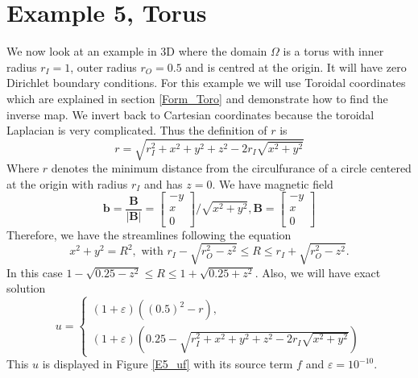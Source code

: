 \documentclass[12pt]{ociamthesis}
\begin{document}
\section{Example 5, Torus}
We now look at an example in 3D where the domain $\Omega $ is a torus with inner radius $r_I = 1$, outer radius $r_O = 0.5$ and is centred at the origin. It will have zero Dirichlet boundary conditions. For this example we will use Toroidal coordinates which are explained in section \ref{Form_Toro} and demonstrate how to find the inverse map. We invert back to Cartesian coordinates because the toroidal Laplacian is very complicated. Thus the definition of $r$ is
\begin{equation}
r = \sqrt{r_I^2 + x^2 + y^2 + z^2 -2r_I\sqrt{x^2+y^2}}
\end{equation}
Where $r$ denotes the minimum distance from the circulfurance of a circle centered at the origin with radius $r_I$ and has $z=0$. We have magnetic field 
\begin{equation}
\mathbf{b} = \frac{\mathbf{B}}{|\mathbf{B}|} = 
\left[ \begin{matrix}
-y\\
 x \\
 0
\end{matrix} \right]/\sqrt{x^2+y^2}, 
\mathbf{B} = \left[ \begin{matrix}
-y\\
 x\\
 0
\end{matrix} \right]
\end{equation}
Therefore, we have the streamlines following the equation
\begin{equation}
x^2 + y^2 = R^2, \text{ with } r_I-\sqrt{r_O^2-z^2} \leq R \leq r_I+\sqrt{r_O^2-z^2}.
\end{equation}
In this case $1-\sqrt{0.25-z^2} \leq R \leq 1 + \sqrt{0.25+z^2}$. Also, we will have exact solution
\begin{equation}
u = 
\begin{cases}
(1+\varepsilon)((0.5)^2 - r ),\\
(1+\varepsilon)(0.25 -  \sqrt{r_I^2 + x^2 + y^2 + z^2 -2r_I\sqrt{x^2+y^2}})
\end{cases}
\end{equation}
This $u$ is displayed in Figure \ref{E5_uf} with its source term $f$ and $\varepsilon=10^{-10}$.
\end{document}
